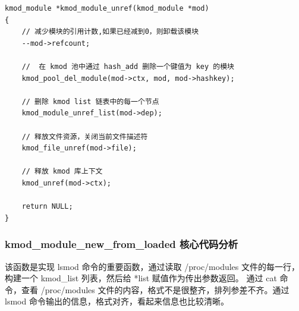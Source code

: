 \documentclass[11pt,a4paper]{article}
\begin{document}
{\begin{shaded}\begin{verbatim}
kmod_module *kmod_module_unref(kmod_module *mod)
{
    // 减少模块的引用计数,如果已经减到0，则卸载该模块
    --mod->refcount;

    //  在 kmod 池中通过 hash_add 删除一个键值为 key 的模块
    kmod_pool_del_module(mod->ctx, mod, mod->hashkey);

    // 删除 kmod list 链表中的每一个节点
    kmod_module_unref_list(mod->dep);

    // 释放文件资源，关闭当前文件描述符
    kmod_file_unref(mod->file);

    // 释放 kmod 库上下文
    kmod_unref(mod->ctx);

    return NULL;
}
\end{verbatim}\end{shaded}}
\subsubsection{kmod\_module\_new\_from\_loaded 核心代码分析}

该函数是实现 lsmod 命令的重要函数，通过读取 /proc/modules
文件的每一行，构建一个 kmod\_list 列表，然后给 *list
赋值作为传出参数返回。 通过 cat 命令，查看 /proc/modules
文件的内容，格式不是很整齐，排列参差不齐。通过 lsmod
命令输出的信息，格式对齐，看起来信息也比较清晰。
\end{document}
